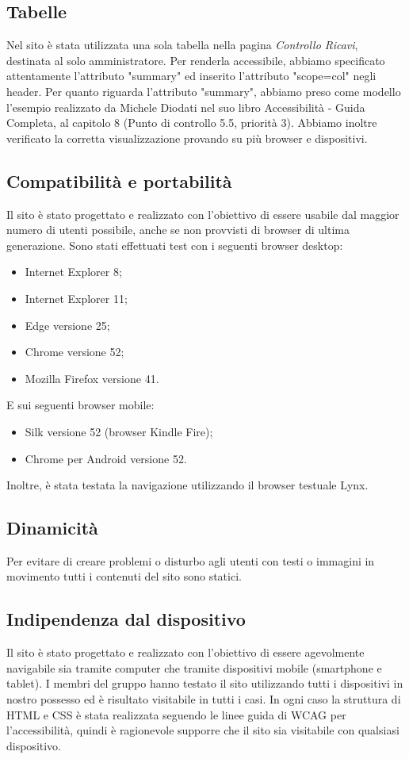 \subsection{Tabelle}
Nel sito è stata utilizzata una sola tabella nella pagina \textit{Controllo Ricavi}, destinata al solo amministratore. Per renderla accessibile, abbiamo specificato attentamente l’attributo "summary" ed inserito l’attributo "scope=col" negli header. \newline
Per quanto riguarda l'attributo "summary", abbiamo preso come modello l'esempio realizzato da Michele Diodati nel suo libro Accessibilità - Guida Completa, al capitolo 8 (Punto di controllo 5.5, priorità 3). \newline
Abbiamo inoltre verificato la corretta visualizzazione provando su più browser e dispositivi.

\subsection{Compatibilità e portabilità}
Il sito è stato progettato e realizzato con l'obiettivo di essere usabile dal maggior numero di utenti possibile, anche se non provvisti di browser di ultima generazione. 
Sono stati effettuati test con i seguenti browser desktop:
\begin{itemize}
	\item Internet Explorer 8;
	\item Internet Explorer 11;
	\item Edge versione 25;
	\item Chrome versione 52;
	\item Mozilla Firefox versione 41.
\end{itemize}
E sui seguenti browser mobile:
\begin{itemize}
	\item Silk versione 52 (browser Kindle Fire);
	\item Chrome per Android versione 52.
\end{itemize}
Inoltre, è stata testata la navigazione utilizzando il browser testuale Lynx.

\subsection{Dinamicità}
Per evitare di creare problemi o disturbo agli utenti con testi o immagini in movimento tutti i contenuti del sito sono statici.

\subsection{Indipendenza dal dispositivo}
Il sito è stato progettato e realizzato con l'obiettivo di essere agevolmente navigabile sia tramite computer che tramite dispositivi mobile (smartphone e tablet).
I membri del gruppo hanno testato il sito utilizzando tutti i dispositivi in nostro possesso ed è risultato visitabile in tutti i casi. \newline
In ogni caso la struttura di HTML e CSS è stata realizzata seguendo le linee guida di WCAG per l'accessibilità, quindi è ragionevole supporre che il sito sia visitabile con qualsiasi dispositivo.


